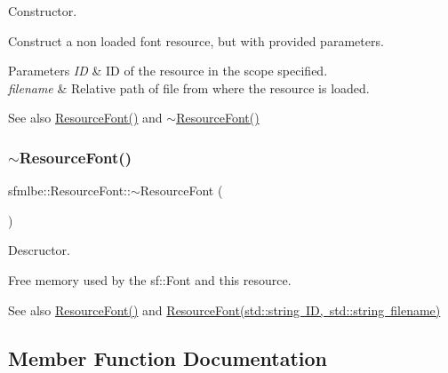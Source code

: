 Constructor. 

Construct a non loaded font resource, but with provided parameters. 
\begin{DoxyParams}{Parameters}
{\em ID} & ID of the resource in the scope specified. \\
\hline
{\em filename} & Relative path of file from where the resource is loaded. \\
\hline
\end{DoxyParams}
\begin{DoxySeeAlso}{See also}
\mbox{\hyperlink{classsfmlbe_1_1_resource_font_a1b841c5e14a228a10db8a3d8c6ef2b0b}{Resource\+Font()}} and \mbox{\hyperlink{classsfmlbe_1_1_resource_font_a01aa16c3fae9a4027620308008ebbce0}{$\sim$\+Resource\+Font()}} 
\end{DoxySeeAlso}
\mbox{\label{classsfmlbe_1_1_resource_font_a01aa16c3fae9a4027620308008ebbce0}} 
\subsubsection{\texorpdfstring{$\sim$\+Resource\+Font()}{~ResourceFont()}}
{\footnotesize\ttfamily sfmlbe\+::\+Resource\+Font\+::$\sim$\+Resource\+Font (\begin{DoxyParamCaption}{ }\end{DoxyParamCaption})}



Descructor. 

Free memory used by the sf\+::\+Font and this resource. \begin{DoxySeeAlso}{See also}
\mbox{\hyperlink{classsfmlbe_1_1_resource_font_a1b841c5e14a228a10db8a3d8c6ef2b0b}{Resource\+Font()}} and \mbox{\hyperlink{classsfmlbe_1_1_resource_font_ad29b31b52682209630a6a8bba1999200}{Resource\+Font(std\+::string I\+D, std\+::string filename)}} 
\end{DoxySeeAlso}


\subsection{Member Function Documentation}
\mbox{\label{classsfmlbe_1_1_resource_font_a22f252c36d8554aade52e873d3331cce}} 
